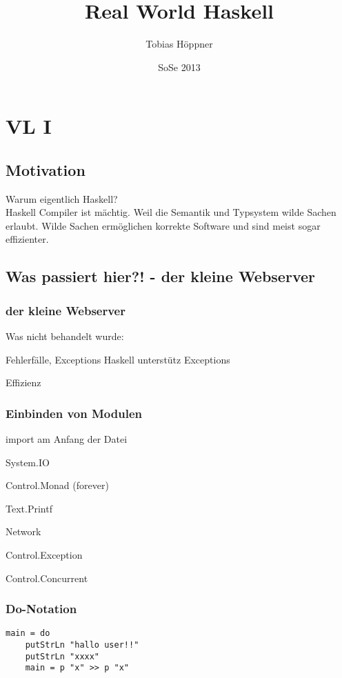\documentclass[ngerman]{report}
\author{Tobias Höppner}
\title{Real World Haskell}
\date{SoSe 2013}
\begin{document}
\maketitle
\tableofcontents
\chapter{VL I}
\section{Motivation}
Warum eigentlich Haskell?\\
Haskell Compiler ist mächtig. Weil die Semantik und Typsystem wilde Sachen erlaubt. Wilde Sachen ermöglichen korrekte Software und sind meist sogar effizienter.\\

\section{Was passiert hier?! - der kleine Webserver}

\subsection{der kleine Webserver}

Was nicht behandelt wurde:
\begin{compactitem}
\item Fehlerfälle, Exceptions
Haskell unterstütz Exceptions 
\item Effizienz
\end{compactitem}


\subsection{Einbinden von Modulen}
import am Anfang der Datei
\begin{compactitem}
\item System.IO
\item Control.Monad (forever)
\item Text.Printf
\item Network
\item Control.Exception
\item Control.Concurrent
\end{compactitem}

\subsection{Do-Notation}
\begin{lstlisting}
main = do
	putStrLn "hallo user!!"
	putStrLn "xxxx"
	main = p "x" >> p "x"
\end{lstlisting}
\end{document}
